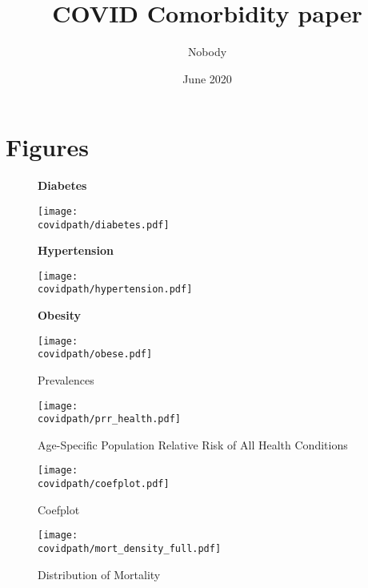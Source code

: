 \documentclass[12pt,letterpaper]{article}
\title{COVID Comorbidity paper} \author{Nobody}
\numberwithin{equation}{section}
\begin{document}
\date{June 2020}

\section{Figures}

\begin{figure}[H]
  \begin{center}
    \caption{Prevalences}
    
    \textbf{Diabetes}
    
    \texttt{[image: \\covidpath/diabetes.pdf]}

    \textbf{Hypertension}
    
    \texttt{[image: \\covidpath/hypertension.pdf]}

    \textbf{Obesity}
    
    \texttt{[image: \\covidpath/obese.pdf]}
    
  \end{center}
\end{figure}

\begin{figure}[H]
  \begin{center}
    \caption{Age-Specific Population Relative Risk of All Health Conditions}
    \texttt{[image: \\covidpath/prr\_health.pdf]}
  \end{center}
\end{figure}

\begin{figure}[H]
  \begin{center}
    \caption{Coefplot}
    \texttt{[image: \\covidpath/coefplot.pdf]}
  \end{center}
\end{figure}

\begin{figure}[H]
  \begin{center}
    \caption{Distribution of Mortality}
    \texttt{[image: \\covidpath/mort\_density\_full.pdf]}
  \end{center}
\end{figure}

\begin{table}[H]
  \begin{center}
    \caption{}
    
  \end{center}
\end{table}

\begin{table}[H]
  \begin{center}
    \caption{}
    
  \end{center}
\end{table}
\end{document}
